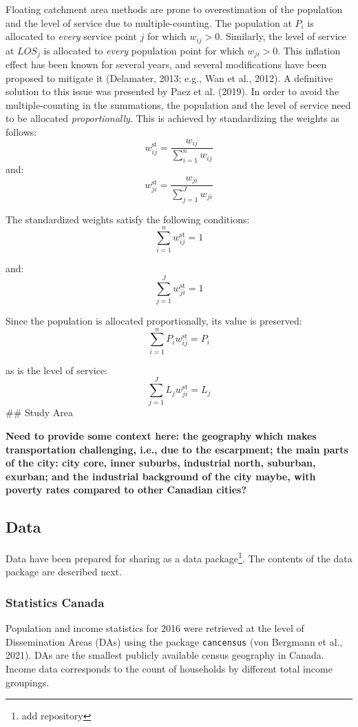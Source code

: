 \documentclass[]{elsarticle} %
\begin{document}
Floating catchment area methods are prone to overestimation of the
population and the level of service due to multiple-counting. The
population at \(P_i\) is allocated to \emph{every} service point \(j\)
for which \(w_{ij}>0\). Similarly, the level of service at \(LOS_j\) is
allocated to \emph{every} population point for which \(w_{ji}>0\). This
inflation effect has been known for several years, and several
modifications have been proposed to mitigate it (Delamater, 2013; e.g.,
Wan et al., 2012). A definitive solution to this issue was presented by
Paez et al. (2019). In order to avoid the multiple-counting in the
summations, the population and the level of service need to be allocated
\emph{proportionally}. This is achieved by standardizing the weights as
follows: \[
w_{ij}^\text{st} = \frac{w_{ij}}{\sum_{i=1}^nw_{ij}}
\] \noindent and: \[
w_{ji}^\text{st} = \frac{w_{ji}}{\sum_{j=1}^Jw_{ji}}
\]

The standardized weights satisfy the following conditions: \[
\sum_{i=1}^nw_{ij}^\text{st}=1
\]

\noindent and: \[
\sum_{j=1}^Jw_{ji}^\text{st}=1
\]

Since the population is allocated proportionally, its value is
preserved: \[
\sum_{i=1}^nP_iw_{ij}^\text{st}=P_i
\]

\noindent as is the level of service: \[
\sum_{j=1}^JL_jw_{ji}^\text{st}=L_j
\] \#\# Study Area

\textbf{Need to provide some context here: the geography which makes
transportation challenging, i.e., due to the escarpment; the main parts
of the city: city core, inner suburbs, industrial north, suburban,
exurban; and the industrial background of the city maybe, with poverty
rates compared to other Canadian cities?}

\hypertarget{data}{%
\subsection{Data}\label{data}}

Data have been prepared for sharing as a data package\footnote{add
  repository}. The contents of the data package are described next.

\hypertarget{statistics-canada}{%
\subsubsection{Statistics Canada}\label{statistics-canada}}

Population and income statistics for 2016 were retrieved at the level of
Dissemination Areas (DAs) using the package \texttt{cancensus} (von
Bergmann et al., 2021). DAs are the smallest publicly available census
geography in Canada. Income data corresponds to the count of households
by different total income groupings.
\end{document}
